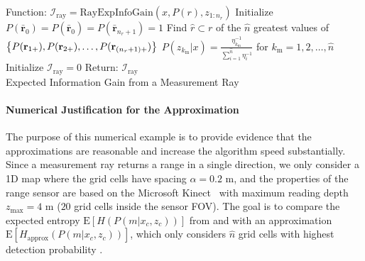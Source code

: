 \vspace*{0.05\columnwidth}
\begin{algorithm}[H]
	Function: $\mathcal I_\text{ray}=\text{RayExpInfoGain}(x,P(r),z_{1:n_{r}})$\;
	Initialize $P(\bar{\mathbf{r}}_{0})=P(\hat{\bar{\mathbf{r}}}_{0})=P(\bar{\mathbf{r}}_{n_{r}+1})=1$\;
	Find $\hat r\subset r$ of the $\hat n$ greatest values of 
	$\left\{ P(\mathbf{r}_{1+}),P(\mathbf{r}_{2+}),\ldots,P(\mathbf{r}_{(n_{r}+1)+}) \right\}$\;
	$P(z_{k_\text{m}}|x)=\frac{\eta^{-1}_{k_\text{m}}}{\sum_{i=1}^{\hat n}\eta^{-1}_{i}}$ for $k_\text{m}=1,2,\ldots,\hat n$\;
	Initialize $\mathcal I_\text{ray}=0$\;
	Return: $\mathcal I_\text{ray}$\\
\caption{Expected Information Gain from a Measurement Ray}
\label{alg:RayExpectedEntropyGain}
\end{algorithm}



\paragraph{Numerical Justification for the Approximation}

The purpose of this numerical example is to provide evidence that the approximations are reasonable and increase the algorithm speed substantially.
Since a measurement ray returns a range in a single direction, we only consider a 1D map where the grid cells have spacing $\alpha=0.2$ m, and the properties of the range sensor are based on the Microsoft Kinect~\cite{PirRutBisSch11,KhoElb12} with maximum reading depth $z_\text{max}=4$ m ($20$ grid cells inside the sensor FOV). The goal is to compare the expected entropy $\text{E}[H(P(m|x_c,z_{c}))]$ from  and with an approximation $\text{E}[H_\text{approx}(P(m|x_c,z_{c}))]$, which only considers $\hat n$ grid cells with highest detection probability .

